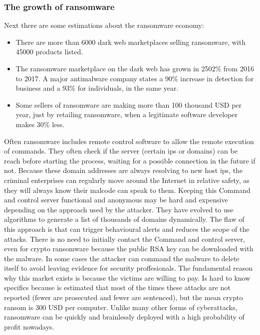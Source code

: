 \subsubsection{The growth of ransomware}
Next there are some estimations about the ransomware economy\cite{ransomware_economy}:
\begin{itemize}
	\item There are more than 6000 dark web marketplaces selling ransomware, with 45000 products listed.
	\item The ransomware marketplace on the dark web has grown in 2502\% from 2016 to 2017.
A major antimalware company states a 90\% increase in detection for business and a 93\% for individuals, in the same year\cite{ransomware_malwarebytes}.
	\item Some sellers of ransomware are making more than 100 thousand USD per year, just by retailing ransomware, when a legitimate software developer makes 30\% less.
\end{itemize}
\linej
Often ransomware includes remote control software to allow the remote execution of commands.
They often check if the server (certain ips or domains) can be reach before starting the process, waiting for a possible connection in the future if not.
Because these domain addresses are always resolving to new host ips, the criminal enterprises can regularly move around the Internet in relative safety, as they will always know their malcode can speak to them.
Keeping this Command and control server functional and anonymous may be hard and expensive depending on the approach used by the attacker.
They have evolved to use algorithms to generate a list of thousands of domains dynamically.
\linej
The flaw of this approach is that can trigger behavioural alerts and reduces the scope of the attacks.
There is no need to initially contact the Command and control server, even for crypto ransomware because the public RSA key can be downloaded with the malware.
In some cases the attacker can command the malware to delete itself to avoid leaving evidence for security proffesionals\cite{ransomware_oReilly}\cite{ransomware_digital_extortion}.
\linej
\linej
The fundamental reason why this market exists is because the victims are willing to pay.
Is hard to know specifics because is estimated that most of the times these attacks are not reported (fewer are prosecuted and fewer are sentenced), but the mean crypto ransom is 300 USD per computer\cite{ransomware_digital_extortion}.
\linej
\linej
Unlike many other forms of cyberattacks, ransomware can be quickly and brainlessly deployed with a high probability of profit nowadays.
